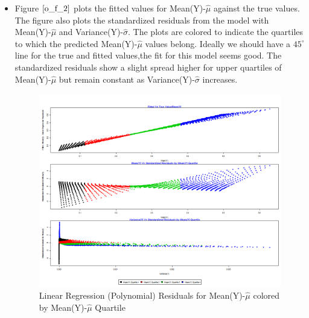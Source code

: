 \documentclass[twoside,12pt]{article}
\begin{document}
\begin{itemize}
\begin{verbatim}
\end{verbatim}

\FloatBarrier
\item
Figure $\eqref{o_f_2}$ plots the fitted values for Mean(Y)-$\hat{\mu}$ against the true values. The figure also plots the standardized residuals from the model with Mean(Y)-$\hat{\mu}$ and Variance(Y)-$\hat{\sigma}$. The plots are colored to indicate the quartiles to which the predicted Mean(Y)-$\hat{\mu}$ values belong. Ideally we should have a $45^{\circ}$ line for the true and fitted values,the fit for this model seems good. The standardized residuals show a slight spread higher for upper quartiles of Mean(Y)-$\hat{\mu}$ but remain constant as Variance(Y)-$\hat{\sigma}$ increases.
\FloatBarrier
\begin{figure}[!htbp]
\centering
\includegraphics[scale=.50]{images/mt_rse_plot_mean_trg_lg_poly.png} 
\caption{Linear Regression (Polynomial) Residuals for Mean(Y)-$\hat{\mu}$ colored by Mean(Y)-$\hat{\mu}$ Quartile}
\label{o_f_2}
\end{figure}


\end{itemize}





\FloatBarrier
\end{document}
